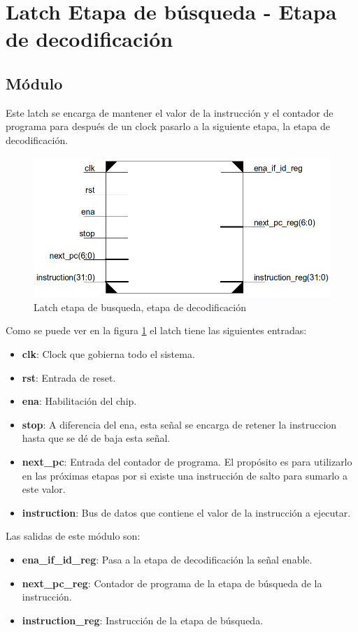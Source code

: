 \newpage
\section{Latch Etapa de búsqueda - Etapa de decodificaci\'on}
\subsection{M\'odulo}
Este latch se encarga de mantener el valor de la instrucci\'on y el contador de programa para despu\'es de un clock pasarlo a la siguiente etapa, la etapa de decodificaci\'on.

\begin{figure}[H]
\centering
\includegraphics[scale=0.35]{img/latch_if_id}
\caption{Latch etapa de busqueda, etapa de decodificaci\'on}
\label{fig:latchifid}
\end{figure}

Como se puede ver en la figura \ref{fig:latchifid} el latch tiene las siguientes entradas:
\begin{itemize}
  \item \textbf{clk}: Clock que gobierna todo el sistema.
  \item \textbf{rst}: Entrada de reset.
  \item \textbf{ena}: Habilitaci\'on del chip.
  \item \textbf{stop}: A diferencia del ena, esta señal se encarga de retener la instruccion hasta que se d\'e de baja esta señal.
  \item \textbf{next\_pc}: Entrada del contador de programa. El prop\'osito es para utilizarlo en las pr\'oximas etapas por si existe una instrucci\'on de salto para sumarlo a este valor.
  \item \textbf{instruction}: Bus de datos que contiene el valor de la instrucci\'on a ejecutar.  
\end{itemize}

Las salidas de este m\'odulo son:
\begin{itemize}
  \item \textbf{ena\_if\_id\_reg}: Pasa a la etapa de decodificaci\'on la señal enable.
  \item \textbf{next\_pc\_reg}: Contador de programa de la etapa de b\'usqueda de la instrucci\'on.
  \item \textbf{instruction\_reg}: Instrucci\'on de la etapa de b\'usqueda.
\end{itemize}